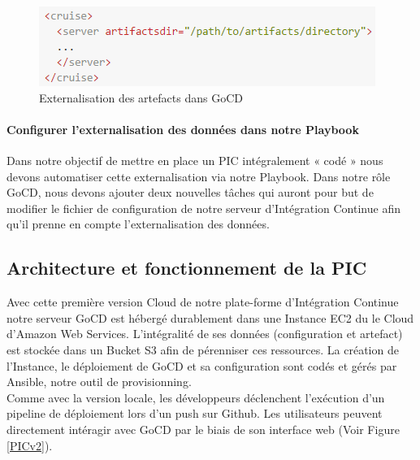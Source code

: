           \begin{figure}
            \begin{center}
              \includegraphics[scale=0.7]{images/ArtifactsDir.png}
            \end{center}
            \caption{Externalisation des artefacts dans GoCD}
            \label{ArtifactsDir}
          \end{figure}

          \paragraph{Configurer l'externalisation des données dans notre Playbook} Dans notre objectif de mettre en place un PIC intégralement « codé » nous devons automatiser cette externalisation via notre Playbook. Dans notre rôle GoCD, nous devons ajouter deux nouvelles tâches qui auront pour but de modifier le fichier de configuration de notre serveur d'Intégration Continue afin qu'il prenne en compte l'externalisation des données.

        \subsection{Architecture et fonctionnement de la PIC}
        Avec cette première version Cloud de notre plate-forme d'Intégration Continue notre serveur GoCD est hébergé durablement dans une Instance EC2 du le Cloud d'Amazon Web Services. L'intégralité de ses données (configuration et artefact) est stockée dans un Bucket S3 afin de pérenniser ces ressources. La création de l'Instance, le déploiement de GoCD et sa configuration sont codés et gérés par Ansible, notre outil de provisionning.\\

        Comme avec la version locale, les développeurs déclenchent l'exécution d'un pipeline de déploiement lors d'un push sur Github. Les utilisateurs peuvent directement intéragir avec GoCD par le biais de son interface web (Voir Figure \ref{PICv2}).\\

